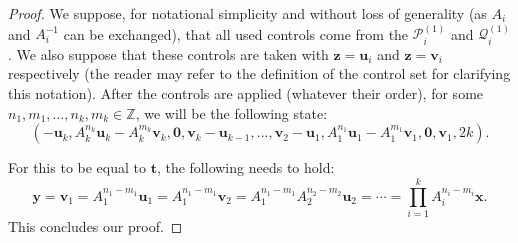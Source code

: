 \begin{proof}
We suppose, for notational simplicity and without loss of generality (as $A_{i}$ and $A_{i}^{-1}$ can be exchanged),
that all used controls come from the $\mathcal{P}_{i}^{(1)}$ and $\mathcal{Q}_{i}^{(1)}$.
We also suppose that these controls are taken with $\boldsymbol{z}=\boldsymbol{u}_{i}$ and $\boldsymbol{z}=\boldsymbol{v}_{i}$ respectively
(the reader may refer to the definition of the control set for clarifying this notation).
After the controls are applied (whatever their order), for some $n_{1}, m_{1}, \ldots, n_{k}, m_{k} \in \mathbb{Z}$, we will be the following state:
\begin{equation*}
  \left(
  -\boldsymbol{u}_{k}, A_{k}^{n_{k}} \boldsymbol{u}_{k} - A_{k}^{m_{k}} \boldsymbol{v}_{k}, \boldsymbol{0}, \boldsymbol{v}_{k} - \boldsymbol{u}_{k-1},
  \ldots,
  \boldsymbol{v}_{2} - \boldsymbol{u}_{1}, A_{1}^{n_{1}} \boldsymbol{u}_{1} - A_{1}^{m_{1}} \boldsymbol{v}_{1}, \boldsymbol{0}, \boldsymbol{v}_{1},
  2k
  \right).
\end{equation*}

For this to be equal to $\boldsymbol{t}$, the following needs to hold:
\begin{equation*}
  \boldsymbol{y} = \boldsymbol{v}_{1} = A_{1}^{n_{1} - m_{1}} \boldsymbol{u}_{1} = A_{1}^{n_{1} - m_{1}} \boldsymbol{v}_{2} =
  A_{1}^{n_{1} - m_{1}} A_{2}^{n_{2} - m_{2}} \boldsymbol{u}_{2} = \cdots = \prod\limits_{i=1}^{k} A_{i}^{n_{i} - m_{i}} \boldsymbol{x}.
\end{equation*}
This concludes our proof.
\end{proof}
